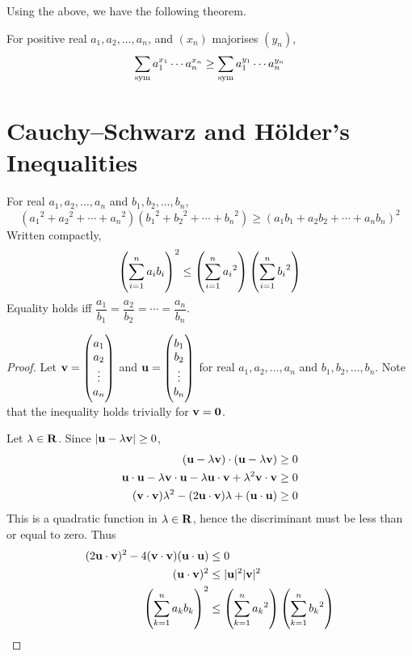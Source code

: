 Using the above, we have the following theorem.

\begin{theorem}
For positive real $a_1,a_2,\dots,a_n$, and $(x_n)$ majorises $(y_n)$,
\begin{equation}
\sum_{\mathrm{sym}} a_1^{x_1}\cdots a_n^{x_n}\ge\sum_{\mathrm{sym}} a_1^{y_1}\cdots a_n^{y_n}
\end{equation}
\end{theorem}

\section{Cauchy--Schwarz and H\"{o}lder’s Inequalities}
\begin{theorem}
For real $a_1, a_2, \dots, a_n$ and $b_1, b_2, \dots, b_n$, 
\begin{equation}
({a_1}^2+{a_2}^2+\cdots+{a_n}^2)({b_1}^2+{b_2}^2+\cdots+{b_n}^2) \ge (a_1 b_1+a_2 b_2+\cdots+a_n b_n)^2
\end{equation} 
Written compactly,
\[ \left(\sum_{i=1}^na_ib_i\right)^2 \le \left(\sum_{i=1}^n{a_i}^2\right)\left(\sum_{i=1}^n{b_i}^2\right) \]
Equality holds iff $\dfrac{a_1}{b_1}=\dfrac{a_2}{b_2}=\cdots=\dfrac{a_n}{b_n}$. 
\end{theorem}

\begin{proof}
Let $\vb{v}=\begin{pmatrix} a_1\\a_2\\\vdots\\a_n \end{pmatrix}$ and $\vb{u}=\begin{pmatrix} b_1\\b_2\\\vdots\\b_n \end{pmatrix}$ for real $a_1,a_2,\dots,a_n$ and $b_1,b_2,\dots,b_n$. Note that the inequality holds trivially for $\vb{v}=\vb{0}$.

Let $\lambda\in\mathbf R$. Since $|\vb{u}-\lambda\vb{v}|\ge0$,
\begin{align*}
(\vb{u}-\lambda\vb{v})\cdot(\vb{u}-\lambda\vb{v}) &\ge 0 \\
\vb{u}\cdot\vb{u}-\lambda\vb{v}\cdot\vb{u}-\lambda\vb{u}\cdot\vb{v}+\lambda^2\vb{v}\cdot\vb{v} &\ge 0 \\
(\vb{v}\cdot\vb{v})\lambda^2-(2\vb{u}\cdot\vb{v})\lambda+(\vb{u}\cdot\vb{u}) &\ge 0
\end{align*}
This is a quadratic function in $\lambda\in\mathbf R$, hence the discriminant must be less than or equal to zero. Thus
\begin{align*}
(2\vb{u}\cdot\vb{v})^2-4(\vb{v}\cdot\vb{v})(\vb{u}\cdot\vb{u}) &\le 0 \\
(\vb{u}\cdot\vb{v})^2 &\le |\vb{u}|^2|\vb{v}|^2 \\
\left(\sum_{k=1}^n a_kb_k\right)^2 &\le \left(\sum_{k=1}^n {a_k}^2\right)\left(\sum_{k=1}^n {b_k}^2\right)
\end{align*}
\end{proof}

